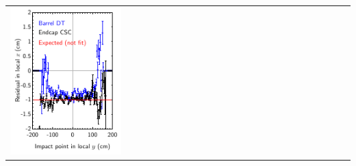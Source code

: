 \documentclass[compress]{beamer}
\begin{document}
\begin{frame}
\begin{center}
\begin{tabular}{p{0.35\linewidth} p{0.35\linewidth} p{0.35\linewidth}}
\begin{minipage}{\linewidth}
	\includegraphics[width=\linewidth]{x_xresid_vs_y}
      \end{minipage} &
      \begin{minipage}{\linewidth}
	\hspace{-1.4 cm}

\end{minipage}
\end{tabular}
\end{center}
\end{frame}
\end{document}
